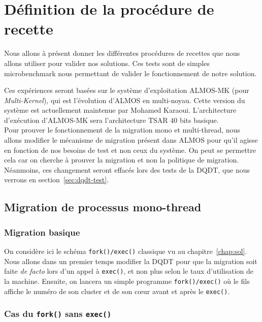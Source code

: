 \chapter{Définition de la procédure de recette}
\label{chap:tests}

  Nous allons à présent donner les différentes procédures de recettes que nous
  allons utiliser pour valider nos solutions. Ces tests sont de simples
  microbenchmark nous permettant de valider le fonctionnement de notre solution.

  Ces expériences seront basées sur le système d'exploitation ALMOS-MK (pour
  \textit{Multi-Kernel}), qui est l'évolution d'ALMOS en multi-noyau. Cette
  version du système est actuellement maintenue par Mohamed
  Karaoui. L'architecture d'exécution d'ALMOS-MK sera l'architecture TSAR 40
  bits basique.\\

  Pour prouver le fonctionnement de la migration mono et multi-thread, nous
  allons modifier le mécanisme de migration présent dans ALMOS pour qu'il agisse
  en fonction de nos besoins de test et non ceux du système. On peut se
  permettre cela car on cherche à prouver la migration et non la politique de
  migration. Néanmoins, ces changement seront effacés lors des tests de la DQDT,
  que nous verrons en section~\ref{sec:dqdt-test}.

  \section{Migration de processus mono-thread}

    \subsection{Migration basique}

      On considère ici le schéma \texttt{fork()/exec()} classique vu au
      chapitre~\ref{chap:sol}. Nous allons dans un premier temps modifier la
      DQDT pour que la migration soit faite \textit{de facto} lors d'un appel à
      \texttt{exec()}, et non plus selon le taux d'utilisation de la
      machine. Ensuite, on lancera un simple programme \texttt{fork()/exec()} où
      le fils affiche le numéro de son cluster et de son c\oe ur avant et après
      le \texttt{exec()}.

    \subsection{Cas du \texttt{fork()} sans \texttt{exec()}}

